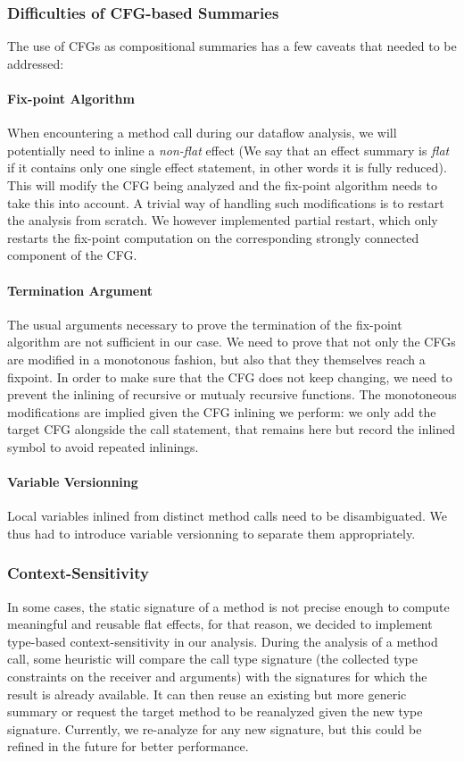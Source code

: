 \documentclass[a4paper]{article}
\begin{document}
\subsubsection{Difficulties of CFG-based Summaries}

The use of CFGs as compositional summaries has a few caveats that needed to be
addressed:

\paragraph{Fix-point Algorithm} When encountering a method call during our
dataflow analysis, we will potentially need to inline a \emph{non-flat} effect
(We say that an effect summary is \emph{flat} if it contains only one single
effect statement, in other words it is fully reduced). This will modify the CFG
being analyzed and the fix-point algorithm needs to take this into account. A
trivial way of handling such modifications is to restart the analysis from
scratch. We however implemented partial restart, which only restarts the
fix-point computation on the corresponding strongly connected component of the
CFG.

\paragraph{Termination Argument} The usual arguments necessary to prove the
termination of the fix-point algorithm are not sufficient in our case. We need
to prove that not only the CFGs are modified in a monotonous fashion, but also
that they themselves reach a fixpoint. In order to make sure that the CFG does
not keep changing, we need to prevent the inlining of recursive or mutualy
recursive functions. The monotoneous modifications are implied given the
CFG inlining we perform: we only add the target CFG alongside the call
statement, that remains here but record the inlined symbol to avoid repeated
inlinings.

\paragraph{Variable Versionning} Local variables inlined from distinct method
calls need to be disambiguated. We thus had to introduce variable versionning
to separate them appropriately.


\subsubsection{Context-Sensitivity}
In some cases, the static signature of a method is not precise enough to
compute meaningful and reusable flat effects, for that reason, we decided to
implement type-based context-sensitivity in our analysis. During the analysis
of a method call, some heuristic will compare the call type signature (the
collected type constraints on the receiver and arguments) with the signatures
for which the result is already available. It can then reuse an existing but
more generic summary or request the target method to be reanalyzed given the new
type signature. Currently, we re-analyze for any new signature, but this could
be refined in the future for better performance.
\end{document}
